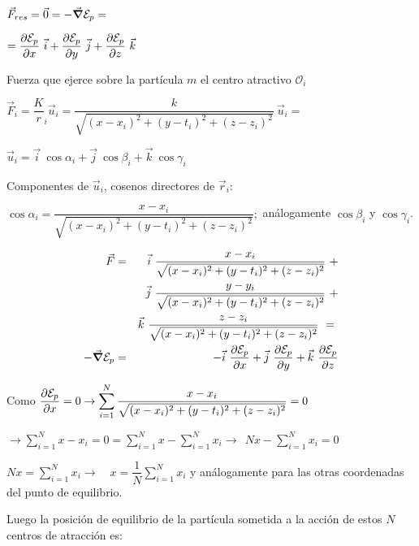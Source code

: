 $\vec F_{res}=\vec 0=-\vec {\grad} \mathcal E_p= $

$=\displaystyle \pdv{\mathcal E_p}{x} \ \vec i + \pdv{\mathcal E_p}{y} \ \vec j + \pdv{\mathcal E_p}{z} \ \vec k $

Fuerza que ejerce sobre la partícula $m$ el centro atractivo $\mathcal O_i$

$\vec F_i=\dfrac K r_i \vec u_i = \dfrac k {\sqrt{(x-x_i)^2+(y-t_i)^2+(z-z_i)^2}} \ \vec u_i=$

$\vec u_i= \vec i \ \cos \alpha_i + \vec j \ \cos \beta_i + \vec k \ \cos \gamma_i$

Componentes de $\vec u_i$, cosenos directores de $\vec r_i$:

$\cos \alpha_i=\dfrac {x-x_i}{\sqrt{(x-x_i)^2+(y-t_i)^2+(z-z_i)^2}}; $ análogamente $\cos \beta_i$ y $\cos \gamma_i$.

\begin{eqnarray*}
\vec F & = & \vec i \ \dfrac {x-x_i}{\sqrt{(x-x_i)^2+(y-t_i)^2+(z-z_i)^2}} \ +  \nonumber \\
    & & \vec j \ \dfrac {y-y_i}{\sqrt{(x-x_i)^2+(y-t_i)^2+(z-z_i)^2}} \ + \nonumber \\
  & & \vec k \ \dfrac {z-z_i}{\sqrt{(x-x_i)^2+(y-t_i)^2+(z-z_i)^2}}  \ = \ \nonumber \\
  -\vec{\grad} \mathcal E_p &= & -\vec i \ \pdv{\mathcal E_p}{x}+ \vec j \ \pdv{\mathcal E_p}{y}+ \vec k \ \pdv{\mathcal E_p}{z}
\end{eqnarray*}


Como $\displaystyle \pdv{\mathcal E_p}{x}=0 \to \sum_{i=1}^N 
\dfrac {x-x_i}{\sqrt{(x-x_i)^2+(y-t_i)^2+(z-z_i)^2}}=0$

$\displaystyle  \to \sum_{i=1}^N x-x_i=0=\sum_{i=1}^N x - \sum_{i=1}^N x_i \to \ \ Nx-\sum_{i=1}^N x_i=0$

$\displaystyle Nx=\sum_{i=1}^N x_i \to \quad x=\dfrac 1 N \sum_{i=1}^N x_i$ y análogamente para las otras coordenadas del punto de equilibrio.


Luego la posición de equilibrio de la partícula sometida a la acción de estos $N$ centros de atracción es:


